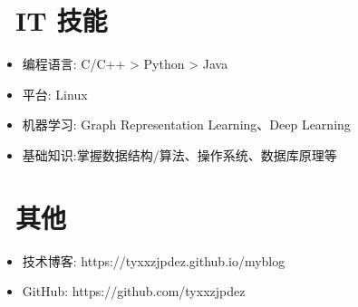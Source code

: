 \documentclass{resume}
\begin{document}

\section{\faCogs\ IT 技能}
\begin{itemize}[parsep=0.5ex]
  \item 编程语言: C/C++ > Python > Java
  \item 平台: Linux
  \item 机器学习: Graph Representation Learning、Deep Learning
  \item 基础知识:掌握数据结构/算法、操作系统、数据库原理等
\end{itemize}

\section{\faInfo\ 其他}
\begin{itemize}[parsep=0.5ex]
  \item 技术博客: https://tyxxzjpdez.github.io/myblog
  \item GitHub: https://github.com/tyxxzjpdez
\end{itemize}

%
%
\end{document}
